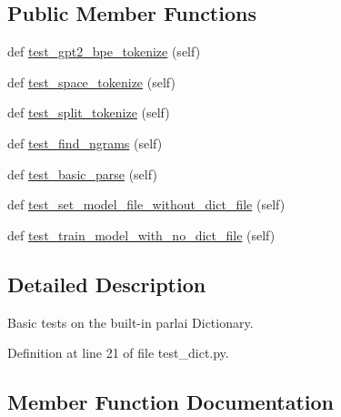 \subsection*{Public Member Functions}
\begin{DoxyCompactItemize}
\item 
def \hyperlink{classtests_1_1test__dict_1_1TestDictionary_a9109b6c1bf1f0e7adfdd3fc4dc1ead74}{test\+\_\+gpt2\+\_\+bpe\+\_\+tokenize} (self)
\item 
def \hyperlink{classtests_1_1test__dict_1_1TestDictionary_aa586d6cf97a48027ee00ed74234acb11}{test\+\_\+space\+\_\+tokenize} (self)
\item 
def \hyperlink{classtests_1_1test__dict_1_1TestDictionary_aa10a7901ffa04a2d0ba43b43b0a18f26}{test\+\_\+split\+\_\+tokenize} (self)
\item 
def \hyperlink{classtests_1_1test__dict_1_1TestDictionary_ae017e72c578005310906979e15c51fe4}{test\+\_\+find\+\_\+ngrams} (self)
\item 
def \hyperlink{classtests_1_1test__dict_1_1TestDictionary_a864b582dad32c539b4499f521c9afb3f}{test\+\_\+basic\+\_\+parse} (self)
\item 
def \hyperlink{classtests_1_1test__dict_1_1TestDictionary_a6c7dcec12a72ba52852f7b214d4783bf}{test\+\_\+set\+\_\+model\+\_\+file\+\_\+without\+\_\+dict\+\_\+file} (self)
\item 
def \hyperlink{classtests_1_1test__dict_1_1TestDictionary_a33993874a2fa2dc57b3936479b17aae1}{test\+\_\+train\+\_\+model\+\_\+with\+\_\+no\+\_\+dict\+\_\+file} (self)
\end{DoxyCompactItemize}


\subsection{Detailed Description}
\begin{DoxyVerb}Basic tests on the built-in parlai Dictionary.\end{DoxyVerb}
 

Definition at line 21 of file test\+\_\+dict.\+py.



\subsection{Member Function Documentation}
\mbox{\label{classtests_1_1test__dict_1_1TestDictionary_a864b582dad32c539b4499f521c9afb3f}} 
